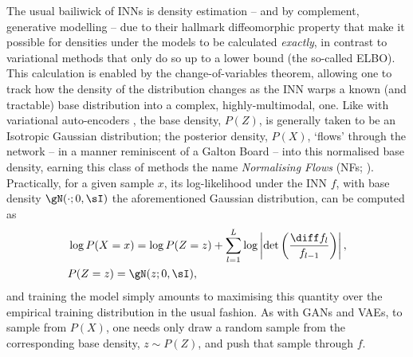 The usual bailiwick of INNs is density estimation -- and by complement, generative modelling --
due to their hallmark diffeomorphic property that make it possible for densities under the models
to be calculated \emph{exactly}, in contrast to variational methods that only do so up to a lower
bound (the so-called ELBO). 
%
%
This calculation is enabled by the change-of-variables theorem, allowing one to track how the
density of the distribution changes as the INN warps a known (and tractable) base distribution into
a complex, highly-multimodal, one.
%
Like with variational auto-encoders \citep{kingma2014auto}, the base density, \(P(Z)\), is
generally taken to be an Isotropic Gaussian distribution; the posterior density, \(P(X)\), `flows'
through the network -- in a manner reminiscent of a Galton Board -- into this normalised base
density, earning this class of methods the name \emph{Normalising Flows} (\ac{NF}s;
\cite{rezende2015variational, kobyzev2020normalizing}).
%
Practically, for a given sample \(x\), its log-likelihood under the INN \(f\), with base density
\(\gN(\cdot; 0, \sI)\) the aforementioned Gaussian distribution, can be computed as
%
\begin{equation*}
%
    \begin{aligned}
        &\log P(X=x) = 
        \log P(Z=z) + \sum_{l=1}^L \log \left| \det\left( \frac{\diff f_l}{ f_{l-1}}\right)
        \right|, \\
        &P(Z=z) = \gN(z; 0, \sI),
    \end{aligned}
\label{eq:cov}
%
\end{equation*}
%
and training the model simply amounts to maximising this quantity over the empirical training
distribution in the usual fashion.
%
As with \ac{GAN}s and \ac{VAE}s, to sample from \(P(X)\), one needs only draw a random sample from the
corresponding base density, \(z \sim P(Z) \), and push that sample through \(f\).


